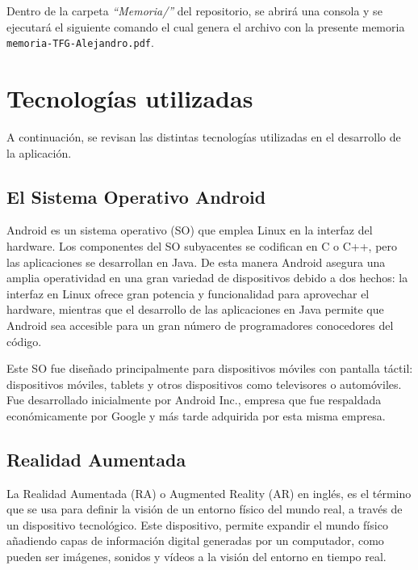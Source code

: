 Dentro de la carpeta \textit{``Memoria/''} del repositorio, se abrirá una consola y se ejecutará el siguiente comando el cual genera el archivo con la presente memoria \texttt{memoria-TFG-Alejandro.pdf}.


\section{Tecnologías utilizadas}

A continuación, se revisan las distintas tecnologías utilizadas en el desarrollo de la aplicación.

\subsection{El Sistema Operativo Android}

Android \cite{URL::Android} es un sistema operativo (SO) que emplea Linux en la interfaz del hardware.  Los componentes del SO subyacentes se codifican en C o C++, pero las aplicaciones se desarrollan en Java. De esta manera Android asegura una amplia operatividad en una gran variedad de dispositivos debido a dos hechos: la interfaz en Linux ofrece gran potencia y funcionalidad para aprovechar el hardware, mientras que el desarrollo de las aplicaciones en Java permite que Android sea accesible para un gran número de programadores conocedores del código.

Este SO fue diseñado principalmente para dispositivos móviles con pantalla táctil: dispositivos móviles, tablets y otros dispositivos como televisores o automóviles. Fue desarrollado inicialmente por Android Inc., empresa que fue respaldada económicamente por Google y más tarde adquirida por esta misma empresa.


\subsection{Realidad Aumentada}

La Realidad Aumentada (RA) \cite{URL::RealidadAumentada} o Augmented Reality (AR) en inglés, es el término que se usa para definir la visión de un entorno físico del mundo real, a través de un dispositivo tecnológico. Este dispositivo, permite expandir el mundo físico añadiendo capas de información digital generadas por un computador, como pueden ser imágenes, sonidos y vídeos a la visión del entorno en tiempo real. 

